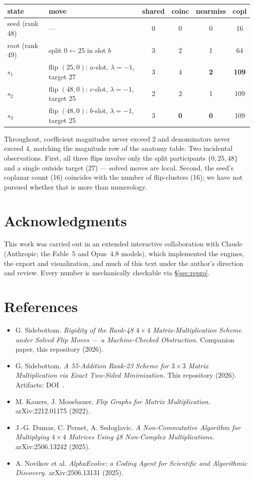 \documentclass[10pt]{article}
\begin{document}
\begin{center}
\begin{tabular}{llcccc}
\toprule
state & move & shared & coinc & nearmiss & copl\\
\midrule
seed (rank 48) & --- & 0 & 0 & 0 & 16\\
root (rank 49) & split $0 \leftarrow 25$ in slot $b$ & 3 & 2 & 1 & 64\\
$s_1$ & flip $(25,0)$: $a$-slot, $\lambda=-1$, target 27 & 3 & 4 & \textbf{2} & \textbf{109}\\
$s_2$ & flip $(48,0)$: $c$-slot, $\lambda=-1$, target 25 & 2 & 2 & 1 & 109\\
$s_3$ & flip $(48,0)$: $b$-slot, $\lambda=-1$, target 25 & 3 & \textbf{0} & \textbf{0} & 109\\
\bottomrule
\end{tabular}
\end{center}

Throughout, coefficient magnitudes never exceed 2 and denominators
never exceed 4, matching the magnitude row of the anatomy table. Two
incidental observations. First, all three flips involve only the
split participants $\{0, 25, 48\}$ and a single outside target (27)
--- solved moves are local. Second, the seed's coplanar count (16)
coincides with the number of flip-clusters (16); we have not pursued
whether that is more than numerology.

\section*{Acknowledgments}

This work was carried out in an extended interactive collaboration
with Claude (Anthropic; the Fable~5 and Opus~4.8 models), which
implemented the engines, the export and visualization, and much of
this text under the author's direction and review. Every number is
mechanically checkable via \S\ref{sec:repro}.

\section*{References}

\begin{itemize}
\item G. Sidebottom. \emph{Rigidity of the Rank-48 $4\times4$
  Matrix-Multiplication Scheme under Solved Flip Moves --- a
  Machine-Checked Obstruction.} Companion paper, this repository
  (2026).
\item G. Sidebottom. \emph{A 55-Addition Rank-23 Scheme for
  $3\times3$ Matrix Multiplication via Exact Two-Sided Minimization.}
  This repository (2026). Artifacts: DOI~.
\item M. Kauers, J. Moosbauer. \emph{Flip Graphs for Matrix
  Multiplication.} arXiv:2212.01175 (2022).
\item J.-G. Dumas, C. Pernet, A. Sedoglavic. \emph{A Non-Commutative
  Algorithm for Multiplying $4\times4$ Matrices Using 48 Non-Complex
  Multiplications.} arXiv:2506.13242 (2025).
\item A. Novikov et al. \emph{AlphaEvolve: a Coding Agent for
  Scientific and Algorithmic Discovery.} arXiv:2506.13131 (2025).
\end{itemize}
\end{document}
